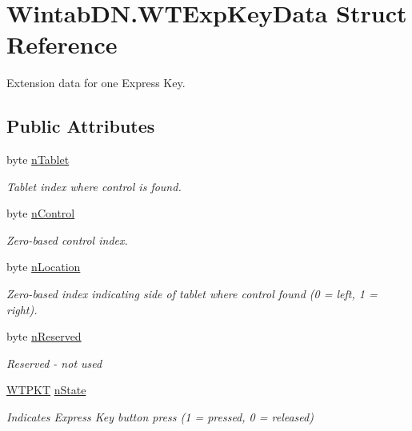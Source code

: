 \hypertarget{struct_wintab_d_n_1_1_w_t_exp_key_data}{}\section{Wintab\+D\+N.\+W\+T\+Exp\+Key\+Data Struct Reference}
\label{struct_wintab_d_n_1_1_w_t_exp_key_data}


Extension data for one Express Key.  


\subsection*{Public Attributes}
\begin{DoxyCompactItemize}
\item 
byte \mbox{\hyperlink{struct_wintab_d_n_1_1_w_t_exp_key_data_a0d27feb54966805c3110795c66be049b}{n\+Tablet}}
\begin{DoxyCompactList}\small\item\em Tablet index where control is found. \end{DoxyCompactList}\item 
byte \mbox{\hyperlink{struct_wintab_d_n_1_1_w_t_exp_key_data_af82f206d52d2d69ec2ed1d582e81a9ab}{n\+Control}}
\begin{DoxyCompactList}\small\item\em Zero-\/based control index. \end{DoxyCompactList}\item 
byte \mbox{\hyperlink{struct_wintab_d_n_1_1_w_t_exp_key_data_ad4d3cdc07318f7b0b4e5ed54631f0dc2}{n\+Location}}
\begin{DoxyCompactList}\small\item\em Zero-\/based index indicating side of tablet where control found (0 = left, 1 = right). \end{DoxyCompactList}\item 
byte \mbox{\hyperlink{struct_wintab_d_n_1_1_w_t_exp_key_data_a9e8b684f72addd70ab91af1a2a0932ea}{n\+Reserved}}
\begin{DoxyCompactList}\small\item\em Reserved -\/ not used \end{DoxyCompactList}\item 
\mbox{\hyperlink{class_wintab_d_n_1_1_w_t_p_k_t}{W\+T\+P\+KT}} \mbox{\hyperlink{struct_wintab_d_n_1_1_w_t_exp_key_data_ab9eb8c83e095d21a6cdc895ddd05a05b}{n\+State}}
\begin{DoxyCompactList}\small\item\em Indicates Express Key button press (1 = pressed, 0 = released) \end{DoxyCompactList}\end{DoxyCompactItemize}


